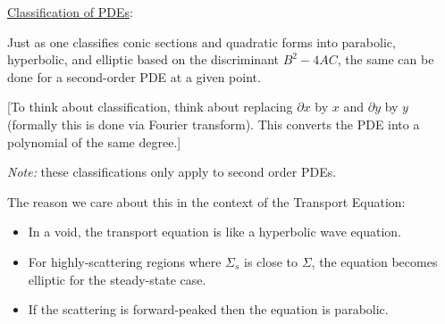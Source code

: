\documentclass[12pt]{article}
\newcommand{\Macro}{\ensuremath{\Sigma}}
\begin{document}
\vspace*{1em}
\underline{Classification of PDEs}:%

Just as one classifies conic sections and quadratic forms into parabolic, hyperbolic, and elliptic based on the discriminant $B^2 - 4AC$, the same can be done for a second-order PDE at a given point. 

[To think about classification, think about replacing $\partial x$ by $x$ and  $\partial y$ by $y$ (formally this is done via Fourier transform). This converts the PDE into a polynomial of the same degree.]

\textit{Note:} these classifications only apply to second order PDEs. 

\noindent The reason we care about this in the context of the Transport Equation:
\begin{itemize}
\item In a void, the transport equation is like a hyperbolic wave equation. 
\item For highly-scattering regions where $\Macro_{s}$ is close to $\Macro$, the equation becomes elliptic for the steady-state case. 
\item If the scattering is forward-peaked then the equation is parabolic.
\end{itemize}
\end{document}
